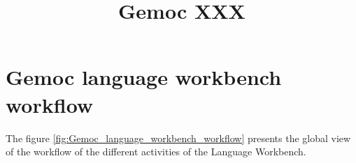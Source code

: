 \documentclass{gemoc} %
\title{Gemoc XXX }
\begin{document}
\maketitle

\begin{revisions}
	\begin{revtable}
		\dates{}{}{}{}{}
		\writers{}{}{}{}{}
		\approvers{}{}{}{}{}
	\end{revtable}
	\begin{revisionlabels}
		\revlabel{}
	\end{revisionlabels}
\end{revisions}
\begin{tableofauthors}
\end{tableofauthors}

\tableofcontents
\newpage

\chapter{Gemoc language workbench workflow}

The figure \ref{fig:Gemoc_language_workbench_workflow} presents the global view of the workflow of the different activities of the Language Workbench.
\end{document}
